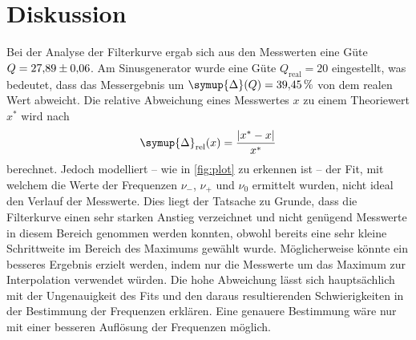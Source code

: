 \section{Diskussion}
\label{sec:Diskussion}
Bei der Analyse der Filterkurve ergab sich aus den Messwerten eine Güte $Q = \num{27.89 +- 0.06}{}$. Am Sinusgenerator wurde eine Güte $Q_\text{real} = 20$
eingestellt, was bedeutet, dass das Messergebnis um $\symup{\Delta}(Q) = \qty{39.45}{\percent}$ von dem realen Wert abweicht.
Die relative Abweichung eines Messwertes $x$ zu einem Theoriewert $x^*$ wird nach 
\begin{equation}
  \label{eqn:Delta_rel}
  \symup{\Delta}_\text{rel}(x) = \frac{|x^* - x|}{x^*}
\end{equation}
berechnet.
Jedoch modelliert -- wie in 
\autoref{fig:plot} zu erkennen ist -- der Fit, mit welchem die Werte der Frequenzen $\nu_-$, $\nu_+$ und $\nu_0$ ermittelt wurden, nicht ideal den Verlauf
der Messwerte. Dies liegt der Tatsache zu Grunde, dass die Filterkurve einen sehr starken Anstieg verzeichnet und nicht genügend Messwerte in diesem Bereich
genommen werden konnten, obwohl bereits eine sehr kleine Schrittweite im Bereich des Maximums gewählt wurde. Möglicherweise könnte ein besseres Ergebnis erzielt 
werden, indem nur die Messwerte um das Maximum zur Interpolation verwendet würden. Die hohe Abweichung lässt sich hauptsächlich mit der Ungenauigkeit des Fits und 
den daraus resultierenden Schwierigkeiten in der Bestimmung der Frequenzen erklären. Eine genauere Bestimmung wäre nur mit einer besseren Auflösung 
der Frequenzen möglich.

